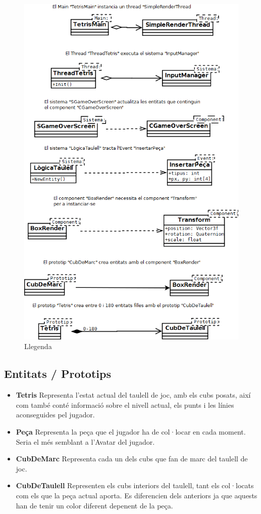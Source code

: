     \begin{figure}
      \centering
      \includegraphics[width=0.7\linewidth]{./img/GuiaDiagramaQuadriga.png}
      \caption{Llegenda \label{fig:GuiaDiagramaQuadriga}}
    \end{figure}

    \subsection{Entitats / Prototips}
      
      \begin{itemize}
        \item {\bf Tetris}
          Representa l'estat actual del taulell de joc, amb els cubs posats, així com també conté informació sobre el nivell actual, els punts i les línies aconseguides pel jugador.
          
        \item {\bf Peça}
          Representa la peça que el jugador ha de col·locar en cada moment. Seria el més semblant a l'Avatar del jugador.
          
        \item {\bf CubDeMarc}
          Representa cada un dels cubs que fan de marc del taulell de joc.
          
        \item {\bf CubDeTaulell}
          Representen els cubs interiors del taulell, tant els col·locats com els que la peça actual aporta. Es diferencien dels anteriors ja que aquests han de tenir un color diferent depenent de la peça.
          
      \end{itemize}

